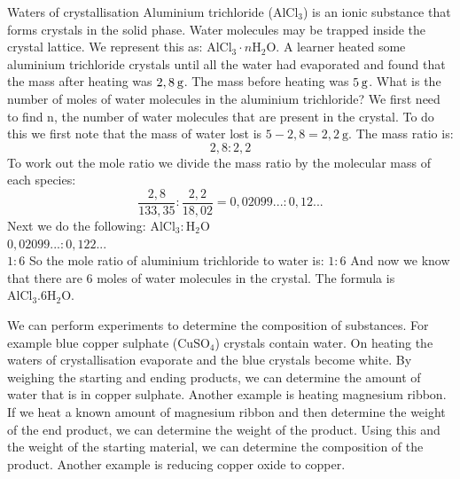     \noindent
\par
            \label{m38712*eid672431}
      \noindent
      \begin{wex}{Waters of crystallisation}{
\label{m38712*pid47982}
\label{m38712*id64827}Aluminium trichloride (${\text{AlCl}}_{3}$) is an ionic substance that forms crystals in the solid phase. Water molecules may be trapped inside the crystal lattice. We represent this as: ${\text{AlCl}}_{3}\ensuremath{\cdot}n{\text{H}}_{2}\text{O}$. A learner heated some aluminium trichloride crystals until all the water had evaporated and found that the mass after heating was $2,8\phantom{\rule{2pt}{0ex}}\text{g}$. The mass before heating was $5\phantom{\rule{2pt}{0ex}}\text{g}$. What is the number of moles of water molecules in the aluminium trichloride?
}
{
We first need to find n, the number of water molecules that are present in the crystal. To do this we first note that the mass of water lost is $5-2,8=2,2~\text{g}$.
  \label{m38712*id3892}The mass ratio is:
 \label{m38712*eid744672}\nopagebreak\noindent{}
    \begin{equation*}
    2,8:2,2
      \end{equation*}
To work out the mole ratio we divide the mass ratio by the molecular mass of each species:
\label{m38712*eid7459432}\nopagebreak\noindent{}
    \begin{equation*}
    \frac{2,8}{133,35}:\frac{2,2}{18,02}=0,02099...:0,12...
      \end{equation*}
Next we do the following:
$\text{AlCl}_{3}:\text{H}_{2}\text{O}$\\
$0,02099...:0,122...$ \\
$1:6$
So the mole ratio of aluminium trichloride to water is: $1:6$
And now we know that there are 6 moles of water molecules in the crystal. The formula is $\text{AlCl}_{3}.6\text{H}_{2}\text{O}$.
}
    \end{wex}
We can perform experiments to determine the composition of substances. For example blue copper sulphate ($\text{CuSO}_{4}$) crystals contain water. On heating the waters of crystallisation evaporate and the blue crystals become white. By weighing the starting and ending products, we can determine the amount of water that is in copper sulphate. Another example is heating magnesium ribbon. If we heat a known amount of magnesium ribbon and then determine the weight of the end product, we can determine the weight of the product. Using this and the weight of the starting material, we can determine the composition of the product. Another example is reducing copper oxide to copper. 

